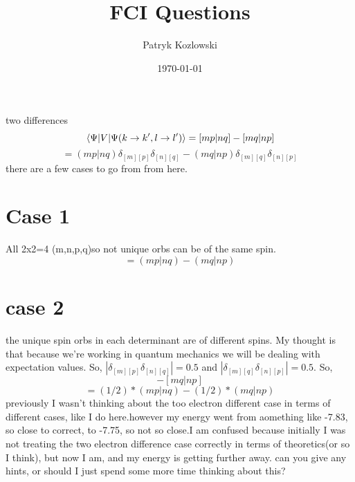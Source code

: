 \documentclass[12pt]{article}
\title{FCI Questions}
\author{Patryk Kozlowski}
\date{\today}
\begin{document}
\maketitle
two differences
\begin{equation}
    \mel{\Psi }{V}{\Psi (k\rightarrow k^{\prime}, l\rightarrow l^{\prime})}
    =[mp|nq]-[mq|np]
\end{equation}
\begin{equation}
    =(mp|nq)\delta _{[m][p]}\delta _{[n][q]}-(mq|np)\delta _{[m][q]}\delta _{[n][p]}
\end{equation}
 there are a few cases to go from from here.
\section{Case 1}
All 2x2=4 (m,n,p,q)so not unique orbs can be of the same spin.
\begin{equation}
    =(mp|nq)-(mq|np)
\end{equation}
\section{case 2}
the unique spin orbs in each determinant are of different spins.
My thought is that because we're working in quantum mechanics we will be dealing with expectation values. So, $|\delta _{[m][p]}\delta _{[n][q]}|=0.5$ and $|\delta _{[m][q]}\delta _{[n][p]}|=0.5$. So, 
\begin{equation}
    [mp|nq]-[mq|np]
\end{equation}
\begin{equation}
    =(1/2)*(mp|nq)-(1/2)*(mq|np)
\end{equation}
previously I wasn't thinking about the too electron different case in terms of different cases, like I do here.however my energy went from aomething like -7.83, so close to correct, to -7.75, so not so close.I am confused because initially I was not treating the two electron difference case correctly in terms of theoretics(or so I think), but now I am, and my energy is getting further away. can you give any hints, or should I just spend some more time thinking about this?
\end{document}
